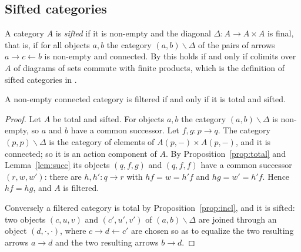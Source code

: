 \subsection{Sifted categories}

A category $A$ is \emph{sifted} if it is non-empty and the diagonal
$\Delta\colon A\to A\times A$ is final, that is, if for all objects $a,b$ the
category $(a,b)\backslash\Delta$ of the pairs of arrows $a\to c\leftarrow b$ is
non-empty and connected. By \cite[Theorem~1.6]{AR} this holds if and only if
colimits over $A$ of diagrams of sets commute with finite products, which is
the definition of sifted categories in \cite[Definition~1.1]{AR}.

\begin{proposition}\label{prop:sifted}
A non-empty connected category is filtered if and only if it is total and
sifted.
\end{proposition}

\begin{proof}
Let $A$ be total and sifted. For objects $a,b$ the category
$(a,b)\backslash\Delta$ is non-empty, so $a$ and $b$ have a common successor.
Let $f,g\colon p\to q$. The category $(p,p)\backslash\Delta$ is the category
of elements of $A(p,-)\times A(p,-)$, and it is connected; so it is an action
component of $A$. By Proposition~\ref{prop:total} and Lemma~\ref{lem:succ}
its objects $(q,f,g)$ and $(q,f,f)$ have a common successor $(r,w,w')$:
there are $h,h'\colon q\to r$ with $hf=w=h'f$ and $hg=w'=h'f$. Hence $hf=hg$,
and $A$ is filtered.

Conversely a filtered category is total by Proposition~\ref{prop:incl}, and
it is sifted: two objects $(c,u,v)$ and $(c',u',v')$ of
$(a,b)\backslash\Delta$ are joined through an object $(d,\cdot,\cdot)$, where
$c\to d\leftarrow c'$ are chosen so as to equalize the two resulting arrows
$a\to d$ and the two resulting arrows $b\to d$.
\end{proof}
